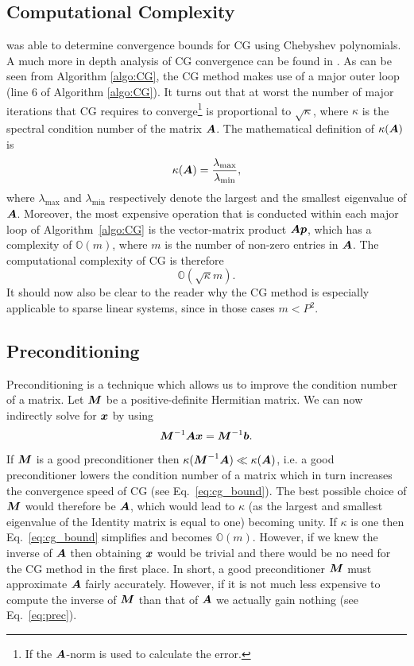 \documentclass[useAMS,usenatbib]{mn2e}
\newcommand{\bA}{\bmath{A}}
\newcommand{\bM}{\bmath{M}}
\newcommand{\bb}{\bmath{b}}
\newcommand{\bx}{\bmath{x}}
\newcommand{\bp}{\bmath{p}}
\begin{document}
\subsection{Computational Complexity}
\citet{Kaniel1966} was able to determine convergence bounds for CG using Chebyshev polynomials. A much more in depth analysis of CG convergence can be found in
\citep{Sluis1986}. As can be seen from Algorithm \ref{algo:CG}, the CG method makes use of a major outer loop (line 6 of Algorithm \ref{algo:CG}). It turns out that at worst 
the number of major iterations that CG requires to converge\footnote{If the $\bA$-norm is used to calculate the error.} is proportional to $\sqrt{\kappa}$, where $\kappa$ is the spectral condition number of the matrix $\bA$.
The mathematical definition of $\kappa(\bA)$ is
\begin{equation}
\label{eq:kappa}
\kappa(\bA) = \frac{\lambda_{\textrm{max}}}{\lambda_{\textrm{min}}}, 
\end{equation}
where $\lambda_{\textrm{max}}$ and $\lambda_{\textrm{min}}$ respectively denote the largest and the smallest eigenvalue of $\bA$.
Moreover, the most expensive operation that is conducted within each major loop of Algorithm~\ref{algo:CG} is the vector-matrix product $\bA\bp$, which has a complexity of $\mathbb{O}(m)$, where $m$ is the number of non-zero entries in $\bA$.
The computational complexity of CG is therefore 
\begin{equation}
\label{eq:cg_bound}
\mathbb{O}(\sqrt{\kappa}m). 
\end{equation}
It should now also be clear to the reader why the CG method is especially applicable to sparse linear systems, since in those cases $m < P^2$.

\subsection{Preconditioning}
Preconditioning is a technique which allows us to improve the condition number of a matrix. Let $\bM$ be a positive-definite Hermitian matrix.
We can now indirectly solve for $\bx$ by using 
\begin{equation}
\label{eq:prec}
\bM^{-1}\bA\bx = \bM^{-1}\bb.
\end{equation}
If $\bM$ is a good preconditioner then $\kappa(\bM^{-1}\bA) \ll \kappa(\bA)$, i.e. a good preconditioner lowers the condition number of a matrix which in turn increases the convergence speed 
of CG (see Eq.~\eqref{eq:cg_bound}). The best possible choice of $\bM$ would therefore be $\bA$, which would lead to $\kappa$ (as the largest and smallest eigenvalue of the Identity matrix is equal to one) becoming unity.
If $\kappa$ is one then Eq.~\eqref{eq:cg_bound} simplifies and becomes $\mathbb{O}(m)$. However, if we knew the inverse of $\bA$ then obtaining $\bx$ would be trivial and there would be no need for the CG method in the first place. 
In short, a good preconditioner $\bM$ must approximate $\bA$ fairly accurately. However, if it is not much less expensive to 
compute the inverse of $\bM$ than that of $\bA$ we actually gain nothing (see Eq.~\eqref{eq:prec}).  
\end{document}
